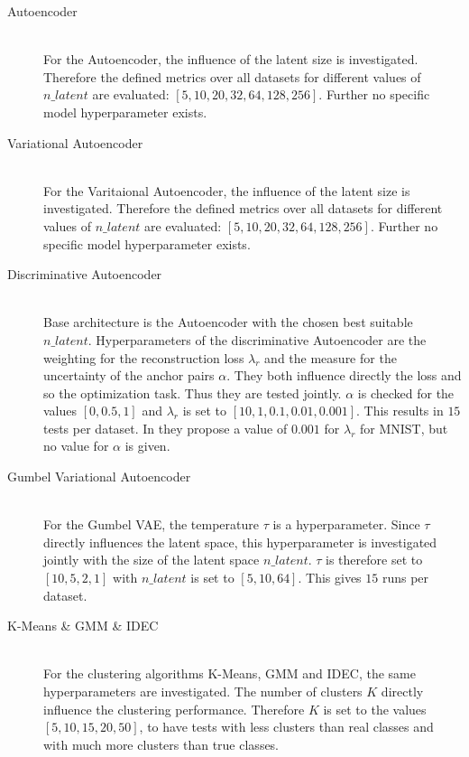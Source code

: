 \documentclass[12pt,DIV14,BCOR12mm,a4paper,footexclude,headinclude,halfparskip-,twoside,openright,openany,cleardoubleempty,idxtotoc,bibtotoc]{scrreprt} %
\numberwithin{equation}{chapter}
\begin{document}
\begin{description}
	\item[Autoencoder]\hfill \\
	For the Autoencoder, the influence of the latent size is investigated. Therefore the defined metrics over all datasets for different values of $n\_latent$ are evaluated: $[5, 10, 20, 32, 64, 128, 256]$. Further no specific model hyperparameter exists.
	\item[Variational Autoencoder]\hfill \\
	For the Varitaional Autoencoder, the influence of the latent size is investigated. Therefore the defined metrics over all datasets for different values of $n\_latent$ are evaluated: $[5, 10, 20, 32, 64, 128, 256]$. Further no specific model hyperparameter exists.
	\item[Discriminative Autoencoder]\hfill \\
	Base architecture is the Autoencoder with the chosen best suitable $n\_latent$. Hyperparameters of the discriminative Autoencoder are the weighting for the reconstruction loss $\lambda_r$ and the measure for the uncertainty of the anchor pairs $\alpha$. They both influence directly the loss and so the optimization task. Thus they are tested jointly. $\alpha$ is checked for the values $[0, 0.5, 1]$ and $\lambda_r$ is set to $[10, 1, 0.1, 0.01, 0.001]$. This results in $15$ tests per dataset. In \cite{DiscriminativeClustering} they propose a value of $0.001$ for $\lambda_r$ for MNIST, but no value for $\alpha$ is given.
	\item[Gumbel Variational Autoencoder]\hfill \\
	For the Gumbel VAE, the temperature $\tau$ is a hyperparameter. Since $\tau$ directly influences the latent space, this hyperparameter is investigated jointly with the size of the latent space $n\_latent$. $\tau$ is therefore set to $[10, 5, 2, 1]$ with $n\_latent$ is set to $[5, 10, 64]$. This gives $15$ runs per dataset.
	\item[K-Means \& GMM \& IDEC]\hfill \\
	For the clustering algorithms K-Means, GMM and IDEC, the same hyperparameters are investigated. The number of clusters $K$ directly influence the clustering performance. Therefore $K$ is set to the values $[5, 10, 15, 20, 50]$, to have tests with less clusters than real classes and with much more clusters than true classes.
\end{description}
\end{document}
